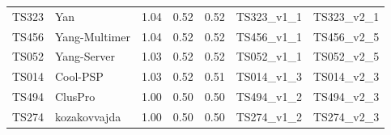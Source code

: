 \begin{table}[ht]
{\begin{tabular}{llrrrll}
TS323 & Yan & 1.04 & 0.52 & 0.52 & TS323\_v1\_1 & TS323\_v2\_1 \\ 
TS456 & Yang-Multimer & 1.04 & 0.52 & 0.52 & TS456\_v1\_1 & TS456\_v2\_5 \\ 
TS052 & Yang-Server & 1.03 & 0.52 & 0.52 & TS052\_v1\_1 & TS052\_v2\_5 \\ 
TS014 & Cool-PSP & 1.03 & 0.52 & 0.51 & TS014\_v1\_3 & TS014\_v2\_3 \\ 
TS494 & ClusPro & 1.00 & 0.50 & 0.50 & TS494\_v1\_2 & TS494\_v2\_3 \\ 
TS274 & kozakovvajda & 1.00 & 0.50 & 0.50 & TS274\_v1\_2 & TS274\_v2\_3 \\ 
\bottomrule
\end{tabular}%
}
\end{table}
